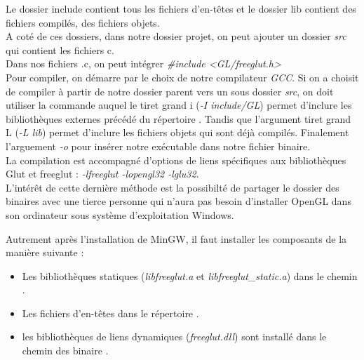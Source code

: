 \documentclass[12pt]{article}
\begin{document}
Le dossier include contient tous les fichiers d'en-têtes et le dossier lib contient des fichiers compilés, des fichiers objets.\\

A coté de ces dossiers, dans notre dossier projet, on peut ajouter un dossier \emph{src} qui contient les fichiers c.\\

Dans nos fichiers .c, on peut intégrer \emph{\#include <GL/freeglut.h>}\\

Pour compiler, on démarre par le choix de notre compilateur \emph{GCC}. Si on a choisit de compiler à partir de notre dossier parent vers un sous dossier \emph{src}, on doit utiliser la commande  auquel le tiret grand i (\emph{-I include/GL}) permet d'inclure les bibliothèques externes précédé du répertoire . Tandis que l'argument tiret grand L (\emph{-L lib}) permet d'inclure les fichiers objets qui sont déjà compilés. Finalement l'arguement \emph{-o } pour insérer notre exécutable dans notre fichier binaire.\\

La compilation est accompagné d'options de liens spécifiques aux bibliothèques Glut et freeglut : \emph{-lfreeglut -lopengl32 -lglu32}.\\


L'intérêt de cette dernière méthode est la possibilté de partager le dossier des binaires avec une tierce personne qui n'aura pas besoin d'installer OpenGL dans son ordinateur sous système d'exploitation Windows.\\


Autrement après l'installation de MinGW, il faut installer les composants de la manière suivante :
\begin{itemize} [label=\textbullet]
\item Les bibliothèques statiques (\emph{libfreeglut.a} et \emph{libfreeglut\_static.a}) dans le chemin .
\item Les fichiers d'en-têtes dans le répertoire .
\item les bibliothèques de liens dynamiques (\emph{freeglut.dll}) sont installé dans le chemin des binaire .
\end{itemize}
\end{document}
